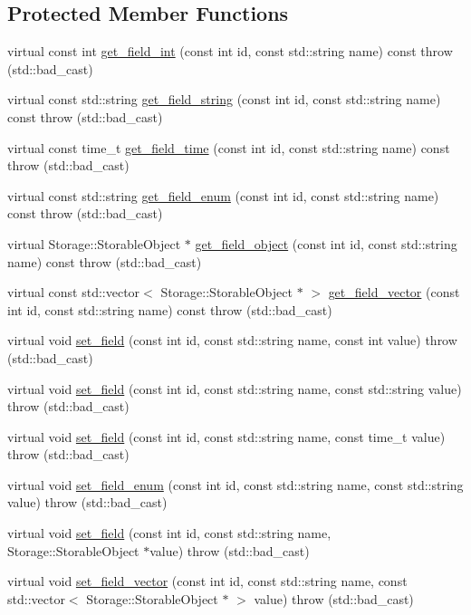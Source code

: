 \subsection*{Protected Member Functions}
\begin{DoxyCompactItemize}
\item 
virtual const int \hyperlink{classSQLiteStorage_aab5d70b4dbe29dbe6e9243a89ee81a89}{get\_\-field\_\-int} (const int id, const std::string name) const   throw (std::bad\_\-cast)
\item 
virtual const std::string \hyperlink{classSQLiteStorage_a5a68da392583ef992a3aff78cfdacc8a}{get\_\-field\_\-string} (const int id, const std::string name) const   throw (std::bad\_\-cast)
\item 
virtual const time\_\-t \hyperlink{classSQLiteStorage_a5fe9e128b183bea0ee7f046eba38cedd}{get\_\-field\_\-time} (const int id, const std::string name) const   throw (std::bad\_\-cast)
\item 
virtual const std::string \hyperlink{classSQLiteStorage_aef325b647f98c8e5fdb402ec608b403b}{get\_\-field\_\-enum} (const int id, const std::string name) const   throw (std::bad\_\-cast)
\item 
virtual Storage::StorableObject $\ast$ \hyperlink{classSQLiteStorage_adf1189839ae893f3ce4c73c3ee69634d}{get\_\-field\_\-object} (const int id, const std::string name) const   throw (std::bad\_\-cast)
\item 
virtual const std::vector$<$ Storage::StorableObject $\ast$ $>$ \hyperlink{classSQLiteStorage_a818cc8edbbe849eabacbdc055a32ad6a}{get\_\-field\_\-vector} (const int id, const std::string name) const   throw (std::bad\_\-cast)
\item 
virtual void \hyperlink{classSQLiteStorage_a3e1271c2699a0e5a82452a21e5d1af63}{set\_\-field} (const int id, const std::string name, const int value)  throw (std::bad\_\-cast)
\item 
virtual void \hyperlink{classSQLiteStorage_ac353c289df54fce5f5658746824fcbac}{set\_\-field} (const int id, const std::string name, const std::string value)  throw (std::bad\_\-cast)
\item 
virtual void \hyperlink{classSQLiteStorage_a36665e18b5290da4c7bab56d22703d03}{set\_\-field} (const int id, const std::string name, const time\_\-t value)  throw (std::bad\_\-cast)
\item 
virtual void \hyperlink{classSQLiteStorage_a1b8a3f2ad138447ad5815e857eea333e}{set\_\-field\_\-enum} (const int id, const std::string name, const std::string value)  throw (std::bad\_\-cast)
\item 
virtual void \hyperlink{classSQLiteStorage_ab2b3d9fcde8dbcd28eb66f60a6cf13ac}{set\_\-field} (const int id, const std::string name, Storage::StorableObject $\ast$value)  throw (std::bad\_\-cast)
\item 
virtual void \hyperlink{classSQLiteStorage_a41c576c779146896a0cd0b18228a643e}{set\_\-field\_\-vector} (const int id, const std::string name, const std::vector$<$ Storage::StorableObject $\ast$ $>$ value)  throw (std::bad\_\-cast)
\end{DoxyCompactItemize}


